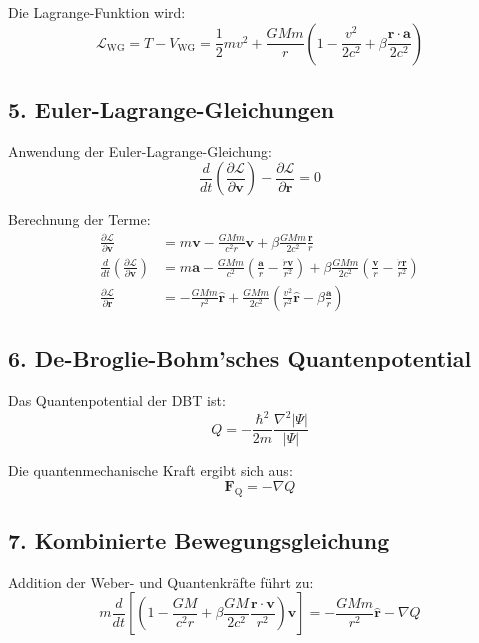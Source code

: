 Die Lagrange-Funktion wird:
\begin{equation}
\mathscr{L}_{\text{WG}} = T - V_{\text{WG}} = \frac{1}{2}mv^2 + \frac{GMm}{r}\left(1 - \frac{v^2}{2c^2} + \beta\frac{\mathbf{r}\cdot\mathbf{a}}{2c^2}\right)
\end{equation}

\subsection*{5. Euler-Lagrange-Gleichungen}
Anwendung der Euler-Lagrange-Gleichung:
\begin{equation}
\frac{d}{dt}\left(\frac{\partial\mathscr{L}}{\partial\mathbf{v}}\right) - \frac{\partial\mathscr{L}}{\partial\mathbf{r}} = 0
\end{equation}

Berechnung der Terme:
\begin{align}
\frac{\partial\mathscr{L}}{\partial\mathbf{v}} &= m\mathbf{v} - \frac{GMm}{c^2r}\mathbf{v} + \beta\frac{GMm}{2c^2}\frac{\mathbf{r}}{r} \\
\frac{d}{dt}\left(\frac{\partial\mathscr{L}}{\partial\mathbf{v}}\right) &= m\mathbf{a} - \frac{GMm}{c^2}\left(\frac{\mathbf{a}}{r} - \frac{\dot{r}\mathbf{v}}{r^2}\right) + \beta\frac{GMm}{2c^2}\left(\frac{\mathbf{v}}{r} - \frac{\dot{r}\mathbf{r}}{r^2}\right) \\
\frac{\partial\mathscr{L}}{\partial\mathbf{r}} &= -\frac{GMm}{r^2}\hat{\mathbf{r}} + \frac{GMm}{2c^2}\left(\frac{v^2}{r^2}\hat{\mathbf{r}} - \beta\frac{\mathbf{a}}{r}\right)
\end{align}

\subsection*{6. De-Broglie-Bohm'sches Quantenpotential}
Das Quantenpotential der DBT ist:
\begin{equation}
Q = -\frac{\hbar^2}{2m}\frac{\nabla^2|\Psi|}{|\Psi|}
\end{equation}

Die quantenmechanische Kraft ergibt sich aus:
\begin{equation}
\mathbf{F}_{\text{Q}} = -\nabla Q
\end{equation}

\subsection*{7. Kombinierte Bewegungsgleichung}
Addition der Weber- und Quantenkräfte führt zu:
\begin{equation}
m\frac{d}{dt}\left[\left(1 - \frac{GM}{c^2r} + \beta\frac{GM}{2c^2}\frac{\mathbf{r}\cdot\mathbf{v}}{r^2}\right)\mathbf{v}\right] = -\frac{GMm}{r^2}\hat{\mathbf{r}} - \nabla Q
\end{equation}

